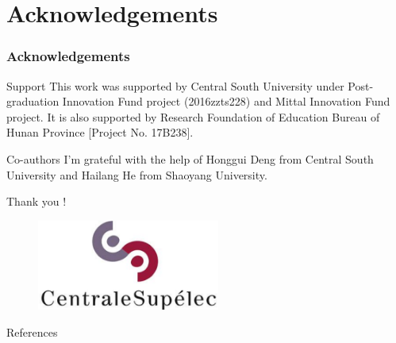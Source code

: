 \documentclass[8 pt]{beamer} %
\begin{document}
\section*{Acknowledgements}
\begin{frame}
\frametitle{Acknowledgements}
\begin{block}{Support}
This work was supported by Central South University under Post-graduation Innovation Fund project (2016zzts228) and Mittal Innovation Fund project. It is also supported by Research Foundation of Education Bureau of Hunan Province [Project No. 17B238].
\end{block}

\begin{block}{Co-authors}
I'm grateful with the help of Honggui Deng from Central South University and Hailang He from Shaoyang University.
\end{block}

\end{frame}

\begin{frame}
\centerline{ {\Huge Thank you !}  }
\begin{figure}
    	\centering \includegraphics[width=6cm]{centralesupelec_logo.eps}
\end{figure}
\end{frame}

\begin{frame}[allowframebreaks]{References} 


\end{frame}
\end{document}
